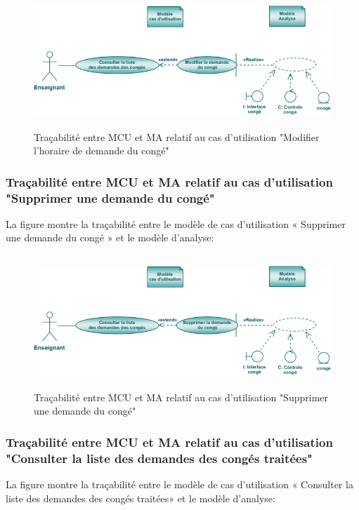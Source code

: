 \documentclass[12 pt]{report}
\begin{document}
\begin{figure}[h]
\begin{center}
\includegraphics[width= 14cm , height =5cm]{tmc.PNG}
\caption{Traçabilité entre MCU et MA relatif au cas d’utilisation "Modifier l'horaire de demande du congé"}
\end{center}
\end{figure}
\subsubsection{Traçabilité entre MCU et MA relatif au cas d’utilisation "Supprimer une demande du congé" }
La figure  montre la traçabilité entre le modèle de cas d’utilisation « Supprimer une demande du congé » et le modèle d’analyse:

\begin{figure}[h]
\begin{center}
\includegraphics[width= 14cm , height =5cm]{tsc.PNG}
\caption{Traçabilité entre MCU et MA relatif au cas d’utilisation "Supprimer une demande du congé"}
\end{center}
\end{figure} 
\subsubsection{Traçabilité entre MCU et MA relatif au cas d’utilisation "Consulter la liste des demandes des congés traitées" }
La figure  montre la traçabilité entre le modèle de cas d’utilisation « Consulter la liste des demandes des congés traitées» et le modèle d’analyse:
\end{document}
